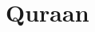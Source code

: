 \documentclass[a4paper,12pt]{book}
\begin{document}
	\frontmatter
	


	
	\mainmatter
	
%	
%	
%	
	
	
	

\chapter{Quraan}
\textarabic{\quransurah[111]}

\textarabic{\quranayah[1][1]}
 \\
 
\textarabic{\quransurah*[108]}


%	
\end{document}
